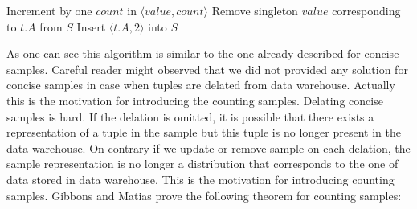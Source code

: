 \begin{center}
  \label{alg:maintenace-counting-samples}
  \begin{algorithmic}
  \State Increment by one $count$ in $\langle value, count \rangle$
  \State Remove singleton $value$ corresponding to $t.A$ from $S$
  \State Insert $\langle t.A, 2 \rangle$ into $S$
  \EndIf
  \EndIf
  \EndFunction
  \State{}
  \EndWhile
  \Else
  \EndIf
  \EndFor
  \EndFunction
\end{algorithmic}
\end{center}

As one can see this algorithm is similar to the one already described
for concise samples. Careful reader might observed that we did not
provided any solution for concise samples in case when tuples are delated from data
warehouse. Actually this is the motivation for
introducing the counting samples. Delating concise samples is hard. If
the delation is omitted, it is possible that there exists a representation of
a tuple in the sample but this tuple is no longer present in the data
warehouse. On contrary if we update or remove sample on each delation,
the sample representation is no longer a distribution that
corresponds to the one of data stored in data warehouse.
This is the motivation for introducing counting samples.
Gibbons and Matias \cite{GM98} prove the following theorem for counting samples:

